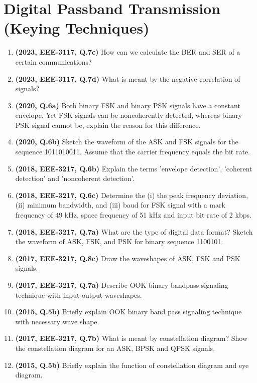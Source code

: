\documentclass[12pt, a4paper]{article}
\begin{document}
	\section{Digital Passband Transmission (Keying Techniques)}
	\begin{enumerate}
		\item \textbf{(2023, EEE-3117, Q.7c)} How can we calculate the BER and SER of a certain communications?
		\item \textbf{(2023, EEE-3117, Q.7d)} What is meant by the negative correlation of signals?
		\item \textbf{(2020, Q.6a)} Both binary FSK and binary PSK signals have a constant envelope. Yet FSK signals can be noncoherently detected, whereas binary PSK signal cannot be, explain the reason for this difference.
		
		\item \textbf{(2020, Q.6b)} Sketch the waveform of the ASK and FSK signals for the sequence 1011010011. Assume that the carrier frequency equals the bit rate.
		
		\item \textbf{(2018, EEE-3217, Q.6b)} Explain the terms 'envelope detection', 'coherent detection' and 'noncoherent detection'.
		
		\item \textbf{(2018, EEE-3217, Q.6c)} Determine the (i) the peak frequency deviation, (ii) minimum bandwidth, and (iii) baud for FSK signal with a mark frequency of 49 kHz, space frequency of 51 kHz and input bit rate of 2 kbps.
		
		\item \textbf{(2018, EEE-3217, Q.7a)} What are the type of digital data format? Sketch the waveform of ASK, FSK, and PSK for binary sequence 1100101.
		\item \textbf{(2017, EEE-3217, Q.8c)} Draw the waveshapes of ASK, FSK and PSK signals.
		
		\item \textbf{(2017, EEE-3217, Q.7a)} Describe OOK binary bandpass signaling technique with input-output waveshapes.
		\item \textbf{(2015, Q.5b)} Briefly explain OOK binary band pass signaling technique with necessary wave shape.
		
		\item \textbf{(2017, EEE-3217, Q.7b)} What is meant by constellation diagram? Show the constellation diagram for an ASK, BPSK and QPSK signals.
		\item \textbf{(2015, Q.5b)} Briefly explain the function of constellation diagram and eye diagram.
		

\end{enumerate}
\end{document}
